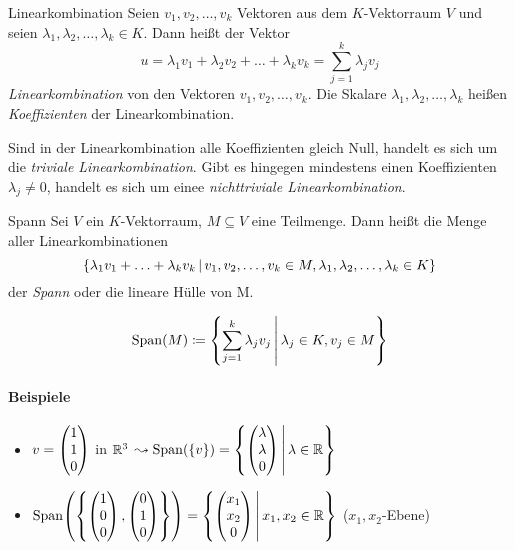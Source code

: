 \begin{definition}{Linearkombination}
	Seien $v_1,v_2,\ldots,v_k$ Vektoren aus dem $K$-Vektorraum $V$ und seien $\lambda_1,\lambda_2,\ldots,\lambda_k \in K$. Dann heißt der Vektor
	\begin{equation*}
	  u=\lambda_1v_1+\lambda_2v_2+\ldots+\lambda_kv_k = \sum\limits_{j=1}^k\lambda_jv_j
	\end{equation*}
	\emph{Linearkombination} von den Vektoren $v_1,v_2,\ldots,v_k$.
	Die Skalare $\lambda_1,\lambda_2,\ldots,\lambda_k$ heißen \emph{Koeffizienten} der Linearkombination.

	Sind in der Linearkombination alle Koeffizienten gleich Null, handelt es sich um die \emph{triviale Linearkombination}. Gibt es hingegen mindestens einen Koeffizienten $\lambda_j \neq 0$, handelt es sich um einee \emph{nichttriviale Linearkombination}.
\end{definition}

\begin{definition}{Spann}
	Sei $V$ ein $K$-Vektorraum, $M\subseteq V$ eine Teilmenge. Dann heißt die Menge aller Linearkombinationen
	\begin{equation*}
	  \left\{ \lambda_1v_1+\ldots+\lambda_kv_k \,\middle|\, v_1,v_2,\ldots,v_k \in M, \lambda_1,\lambda_2,\ldots,\lambda_k \in K \right\}
	\end{equation*}
	der \emph{Spann} oder die lineare Hülle von M.
\end{definition}


\begin{equation*}
  \operatorname{Span}\! \left(M\right)\coloneqq \left\{ \sum\limits_{j=1}^k\lambda_jv_j \,\middle|\, \lambda_j \in K, v_j\in M \right\}
\end{equation*}

\paragraph{Beispiele}
\begin{itemize}
  \item $v=\vector{1\\1\\0}$ in $\mathbb{R}^3$ $\leadsto \spann{\{v\}} = \set{\vector{\lambda\\\lambda\\0}}{\lambda \in \R}$
  \item $\spann{\simpleset{\vector{1\\0\\0},\vector{0\\1\\0}}} = \set{\vector{x_1\\x_2\\0}}{x_1,x_2\in\R}$ ($x_1,x_2$-Ebene)
\end{itemize}

